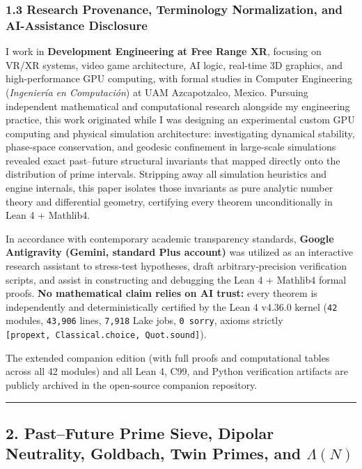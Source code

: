\documentclass[
  11pt,
]{article}
\begin{document}
\subsubsection{1.3 Research Provenance, Terminology Normalization, and
AI-Assistance
Disclosure}\label{research-provenance-terminology-normalization-and-ai-assistance-disclosure}

I work in \textbf{Development Engineering at Free Range XR}, focusing on
VR/XR systems, video game architecture, AI logic, real-time 3D graphics,
and high-performance GPU computing, with formal studies in Computer
Engineering (\emph{Ingeniería en Computación}) at UAM Azcapotzalco,
Mexico. Pursuing independent mathematical and computational research
alongside my engineering practice, this work originated while I was
designing an experimental custom GPU computing and physical simulation
architecture: investigating dynamical stability, phase-space
conservation, and geodesic confinement in large-scale simulations
revealed exact past--future structural invariants that mapped directly
onto the distribution of prime intervals. Stripping away all simulation
heuristics and engine internals, this paper isolates those invariants as
pure analytic number theory and differential geometry, certifying every
theorem unconditionally in Lean 4 + Mathlib4.

In accordance with contemporary academic transparency standards,
\textbf{Google Antigravity (Gemini, standard Plus account)} was utilized
as an interactive research assistant to stress-test hypotheses, draft
arbitrary-precision verification scripts, and assist in constructing and
debugging the Lean 4 + Mathlib4 formal proofs. \textbf{No mathematical
claim relies on AI trust:} every theorem is independently and
deterministically certified by the Lean 4 v4.36.0 kernel (\texttt{42}
modules, \texttt{43,906} lines, \texttt{7,918} Lake jobs,
\texttt{0\ sorry}, axioms strictly
\texttt{{[}propext,\ Classical.choice,\ Quot.sound{]}}).

The extended companion edition (with full proofs and computational
tables across all 42 modules) and all Lean 4, C99, and Python
verification artifacts are publicly archived in the open-source
companion repository.

\begin{center}\rule{0.5\linewidth}{0.5pt}\end{center}

\subsection{\texorpdfstring{2. Past--Future Prime Sieve, Dipolar
Neutrality, Goldbach, Twin Primes, and
\(\Lambda(N)\)}{2. Past--Future Prime Sieve, Dipolar Neutrality, Goldbach, Twin Primes, and \textbackslash Lambda(N)}}\label{pastfuture-prime-sieve-dipolar-neutrality-goldbach-twin-primes-and-lambdan}
\end{document}
